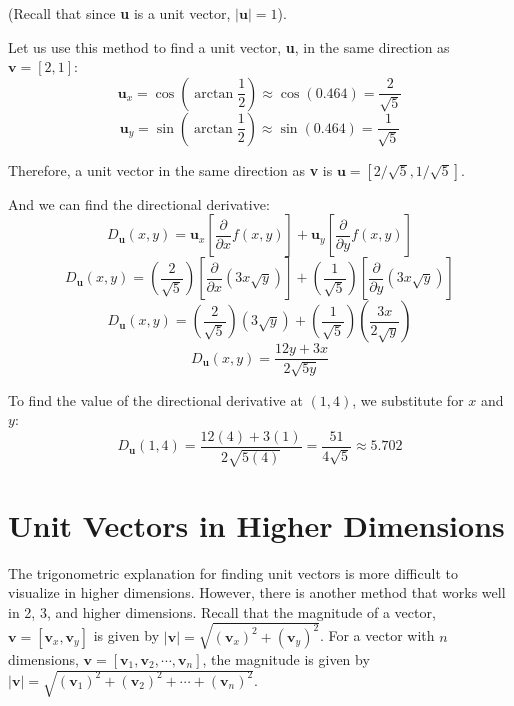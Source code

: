 \begin{Worked}
\begin{Solution}
(Recall that since \textbf{u} is a unit vector, $|\textbf{u}| = 1$). 

Let us use this method to find a unit vector, \textbf{u}, in the same direction 
as $\textbf{v} = \left[ 2, 1 \right]$:
$$\textbf{u}_x = \cos{ \left( \arctan{ \frac{1}{2} } \right) } \approx \cos{ 
\left( 0.464 \right) } = \frac{2}{\sqrt{5}}$$
$$\textbf{u}_y = \sin{ \left( \arctan{ \frac{1}{2} } \right) } \approx \sin{ 
\left( 0.464 \right)} = \frac{1}{\sqrt{5}}$$

Therefore, a unit vector in the same direction as \textbf{v} is $\textbf{u} = 
\left[ 2/\sqrt{5}, 1/\sqrt{5} \right]$. 

And we can find the directional derivative:
$$D_{\textbf{u}}(x, y) = \textbf{u}_x \left[ \frac{\partial}{\partial x} f(x, 
y) \right] + \textbf{u}_y \left[ \frac{\partial}{\partial y} f(x, y) \right]$$
$$D_{\textbf{u}}(x, y) = \left( \frac{2}{\sqrt{5}} \right) \left[ \frac{
\partial}{\partial x} \left( 3x\sqrt{y} \right) \right] + \left( \frac{1}{
\sqrt{5}} \right) \left[ \frac{\partial}{\partial y} \left( 3x\sqrt{y} \right) 
\right]$$
$$D_{\textbf{u}}(x, y) = \left( \frac{2}{\sqrt{5}} \right) \left( 3\sqrt{y} 
\right) + \left( \frac{1}{\sqrt{5}} \right) \left( \frac{3x}{2\sqrt{y}} 
\right)$$
$$D_{\textbf{u}}(x, y) = \frac{12y + 3x}{2\sqrt{5y}}$$

To find the value of the directional derivative at $(1, 4)$, we 
substitute for $x$ and $y$:
$$D_{\textbf{u}}(1, 4) = \frac{12(4) + 3(1)}{2\sqrt{5(4)}} = \frac{51}{4\sqrt{5}} 
\approx 5.702$$
\end{Solution}
\end{Worked}

\section{Unit Vectors in Higher Dimensions}
The trigonometric explanation for finding unit vectors is more difficult to 
visualize in higher dimensions. However, there is another method that works 
well in 2, 3, and higher dimensions. Recall that the magnitude of a vector, 
$\textbf{v} = \left[ \textbf{v}_x, \textbf{v}_y \right]$ is given by $| 
\textbf{v} | = \sqrt{\left( \textbf{v}_x \right)^2 + \left( \textbf{v}_y 
\right)^2}$. For a vector with $n$ dimensions, $\textbf{v} = \left[ \textbf{v}_
1, \textbf{v}_2, \cdots , \textbf{v}_n \right]$, the magnitude is given by $| 
\textbf{v} | = \sqrt{ \left( \textbf{v}_1 \right)^2 + \left( \textbf{v}_2 
\right)^2 + \cdots + \left( \textbf{v}_n \right)^2}$. 


